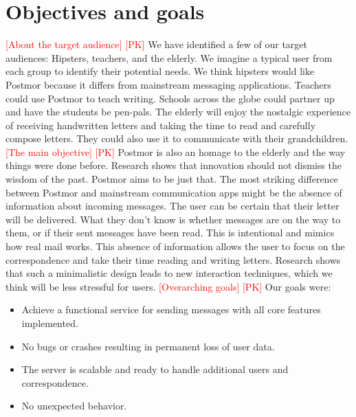 \documentclass[acmlarge, review=false, screen=true]{acmart}
\begin{document}
  \section{Objectives and goals}
    \textcolor{red}{[About the target audience] [PK]} \newline
    We have identified a few of our target audiences: Hipsters, teachers, and the elderly. We imagine a typical user from each group to identify their potential needs. We think hipsters would like Postmor because it differs from mainstream messaging applications. Teachers could use Postmor to teach writing. Schools across the globe could partner up and have the students be pen-pals. The elderly will enjoy the nostalgic experience of receiving handwritten letters and taking the time to read and carefully compose letters. They could also use it to communicate with their grandchildren. 
\newline\newline
    \textcolor{red}{[The main objective] [PK]} \newline
    Postmor is also an homage to the elderly and the way things were done before. Research shows that innovation should not dismiss the wisdom of the past\cite{design-inspiration}. Postmor aims to be just that. The most striking difference between Postmor and mainstream communication apps might be the absence of information about incoming messages. The user can be certain that their letter will be delivered. What they don’t know is whether messages are on the way to them, or if their sent messages have been read. This is intentional and mimics how real mail works. This absence of information allows the user to focus on the correspondence and take their time reading and writing letters. Research shows that such a minimalistic design leads to new interaction techniques\cite{simplicity-in-interactiondesign}, which we think will be less stressful for users.
\newline\newline
    \textcolor{red}{[Overarching goals] [PK]} \newline
    Our goals were:
    \begin{itemize}
      \item Achieve a functional service for sending messages with all core features implemented.
      \item No bugs or crashes resulting in permanent loss of user data. 
      \item The server is scalable and ready to handle additional users and correspondence. 
      \item No unexpected behavior. 
    \end{itemize}
\end{document}
